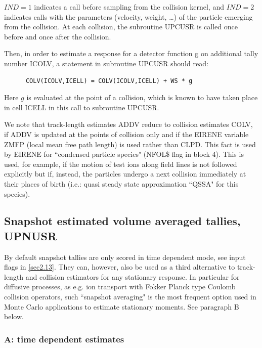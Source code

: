 $IND=1$ indicates a call before sampling from the collision kernel, and $IND=2$
indicates calls with the parameters (velocity, weight, \dots) of the particle
emerging from the collision.
At each collision, the subroutine UPCUSR is called once before and once after
the collision.

Then, in order to estimate a response for a detector function g on additional
tally number ICOLV, a statement in subroutine UPCUSR should read:

\begin{lstlisting}
      COLV(ICOLV,ICELL) = COLV(ICOLV,ICELL) + WS * g
\end{lstlisting}

Here $g$ is evaluated at the point of a collision, which is known to have taken
place in cell ICELL in this call to subroutine UPCUSR.

We note that track-length estimates ADDV reduce to collision estimates COLV, if
ADDV is updated at the points of collision only and if the EIRENE variable ZMFP
(local mean free path length) is used rather than CLPD.
This fact is used by EIRENE for ``condensed particle species" (NFOL\$ flag in
block 4).
This is used, for example, if the motion of test ions along field lines is not
followed explicitly but if, instead, the particles undergo a next collision
immediately at their places of birth (i.e.: quasi steady state approximation
``QSSA" for this species).

\subsection{Snapshot estimated volume averaged tallies, UPNUSR}\label{sec3.2.3}

By default snapshot tallies are only scored in time dependent mode, see input
flags in \cref{sec2.13}.
They can, however, also be used as a third alternative to track-length and
collision estimators for any stationary response.
In particular for diffusive processes, as e.g. ion transport with Fokker Planck
type Coulomb collision operators, such ``snapshot averaging" is the most
frequent option used in Monte Carlo applications to estimate stationary
moments.
See paragraph B below.

\subsubsection{A: time dependent estimates}

